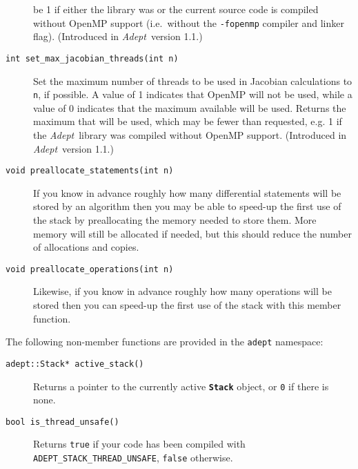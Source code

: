 \documentclass[a4,oneside]{book}
\def\codesize{\small}
\def\Adept{\emph{Adept}}
\def\code#1{{\codesize\texttt{#1}}}
\def\codebf#1{{\codesize\texttt{\textbf{#1}}}}
\def\citem#1{\item[{\codesize\texttt{#1}}]}
\begin{document}
\begin{description}
be 1 if either the library was or the current source code is compiled
without OpenMP support (i.e.\ without the \code{-fopenmp} compiler and
linker flag). (Introduced in \Adept\ version 1.1.) 
\citem{int set\_max\_jacobian\_threads(int n)} Set the maximum number of
threads to be used in Jacobian calculations to \code{n}, if
possible. A value of 1 indicates that OpenMP will not be used, while a
value of 0 indicates that the maximum available will be used. Returns
the maximum that will be used, which may be fewer than requested,
e.g. 1 if the \Adept\ library was compiled without OpenMP
support. (Introduced in \Adept\ version 1.1.) 
\citem{void preallocate\_statements(int n)} If you know in advance
roughly how many differential statements will be stored by an
algorithm then you may be able to speed-up the first use of the stack
by preallocating the memory needed to store them.  More memory will
still be allocated if needed, but this should reduce the number of
allocations and copies.
\citem{void preallocate\_operations(int n)} Likewise, if you know in
advance roughly how many operations will be stored then you can
speed-up the first use of the stack with this member function.
\end{description}

\noindent The following non-member functions are provided in the
\code{adept} namespace:
\begin{description}
\citem{adept::Stack* active\_stack()} Returns a pointer to the
currently active \codebf{Stack} object, or \code{0} if there is none.
\citem{bool is\_thread\_unsafe()} Returns \code{true} if your code has
been compiled with \code{ADEPT\_STACK\_THREAD\_UNSAFE}, \code{false}
otherwise.
%
\end{description}
\end{document}

